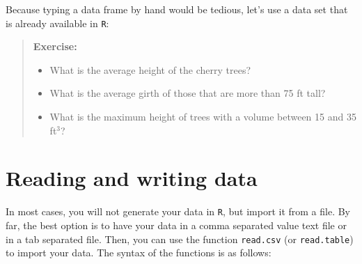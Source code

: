 \documentclass[
  letterpaper,
  DIV=11,
  numbers=noendperiod]{scrreprt}
\newenvironment{Shaded}{\begin{snugshade}}{\end{snugshade}}
\newcommand{\NormalTok}[1]{\textcolor[rgb]{0.00,0.23,0.31}{#1}}
\providecommand{\tightlist}{%
  \setlength{\itemsep}{0pt}\setlength{\parskip}{0pt}}\usepackage{longtable,booktabs,array}
\begin{document}
Because typing a data frame by hand would be tedious, let's use a data
set that is already available in \texttt{R}:

\begin{Shaded}
\end{Shaded}

\begin{quote}
\textbf{Exercise:}

\begin{itemize}
\tightlist
\item
  What is the average height of the cherry trees?
\item
  What is the average girth of those that are more than 75 ft tall?
\item
  What is the maximum height of trees with a volume between 15 and 35
  ft\(^3\)?
\end{itemize}
\end{quote}

\section*{Reading and writing data}\label{reading-and-writing-data}


In most cases, you will not generate your data in \texttt{R}, but import
it from a file. By far, the best option is to have your data in a comma
separated value text file or in a tab separated file. Then, you can use
the function \texttt{read.csv} (or \texttt{read.table}) to import your
data. The syntax of the functions is as follows:
\end{document}
